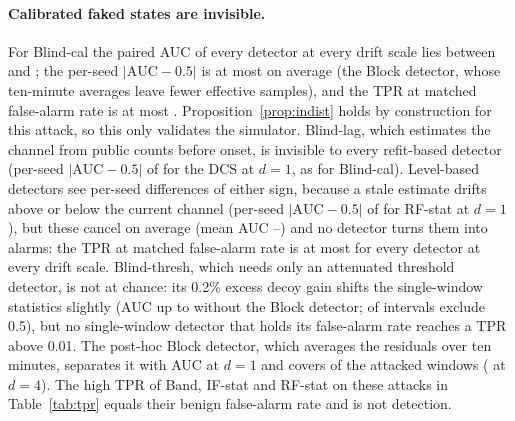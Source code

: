 \paragraph{Calibrated faked states are invisible.} For Blind-cal the paired AUC of every detector at every drift scale lies between \aucCalMin{} and \aucCalMax; the per-seed $|\mathrm{AUC}-0.5|$ is at most \aucAbsMaxCal{} on average (the Block detector, whose ten-minute averages leave fewer effective samples), and the TPR at matched false-alarm rate is at most \tprOrMaxCal. Proposition~\ref{prop:indist} holds by construction for this attack, so this only validates the simulator. Blind-lag, which estimates the channel from public counts before onset, is invisible to every refit-based detector (per-seed $|\mathrm{AUC}-0.5|$ of \aucAbsLagDCSDOne{} for the DCS at $d=1$, as for Blind-cal). Level-based detectors see per-seed differences of either sign, because a stale estimate drifts above or below the current channel (per-seed $|\mathrm{AUC}-0.5|$ of \aucAbsLagRFstatDOne{} for RF-stat at $d=1$), but these cancel on average (mean AUC \aucLagMin--\aucLagMax) and no detector turns them into alarms: the TPR at matched false-alarm rate is at most \tprOrMaxLag{} for every detector at every drift scale. Blind-thresh, which needs only an attenuated threshold detector, is not at chance: its 0.2\% excess decoy gain shifts the single-window statistics slightly (AUC up to \aucThreshMax{} without the Block detector; \nExclThresh{} of \nCellsThresh{} intervals exclude 0.5), but no single-window detector that holds its false-alarm rate reaches a TPR above 0.01. The post-hoc Block detector, which averages the residuals over ten minutes, separates it with AUC \aucThreshBlockDOne{} at $d=1$ and covers \tprThreshBlockDOne{} of the attacked windows (\tprThreshBlockDFour{} at $d=4$). The high TPR of Band, IF-stat and RF-stat on these attacks in Table~\ref{tab:tpr} equals their benign false-alarm rate and is not detection.

